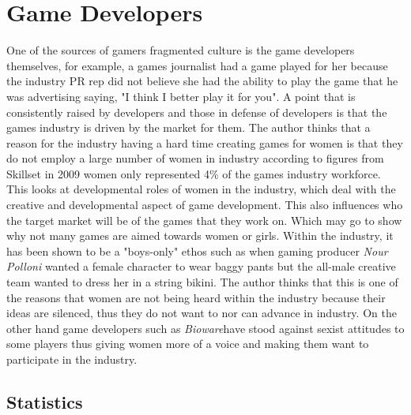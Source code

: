 \documentclass[11pt]{scrartcl}
\begin{document}
\section{Game Developers}

One of the sources of gamers fragmented culture is the game developers themselves, for example, a games journalist had a game played for her because the industry PR rep did not believe she had the ability to play the game that he was advertising saying, "I think I better play it for you"\cite{consalvo2012confronting}. A point that is consistently raised by developers and those in defense of developers is that the games industry is driven by the market for them.\cite{fron2007hegemony} The author thinks that a reason for the industry having a hard time creating games for women is that they do not employ a large number of women in industry according to figures from Skillset in 2009 women only represented 4\% of the games industry workforce.\cite{skillset_2009} This looks at developmental roles of women in the industry, which deal with the creative and developmental aspect of game development. This also influences who the target market will be of the games that they work on.\cite{prescott2011segregation} Which may go to show why not many games are aimed towards women or girls. Within the industry, it has been shown to be a "boys-only" ethos such as when gaming producer \emph{Nour Polloni} wanted a female character to wear baggy pants but the all-male creative team wanted to dress her in a string bikini. The author thinks that this is one of the reasons that women are not being heard within the industry because their ideas are silenced, thus they do not want to nor can advance in industry\cite{marriott_2003}. On the other hand game developers such as \emph{Bioware}have stood against sexist attitudes to some players thus giving women more of a voice and making them want to participate in the industry.\cite{consalvo2012confronting}


\subsection{Statistics}
\end{document}
